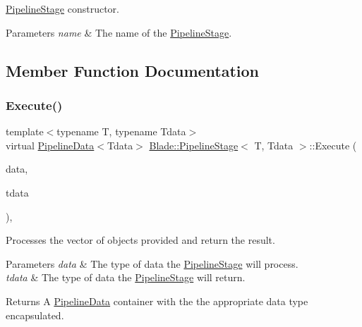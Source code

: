 \hyperlink{class_blade_1_1_pipeline_stage}{Pipeline\+Stage} constructor. 


\begin{DoxyParams}{Parameters}
{\em name} & The name of the \hyperlink{class_blade_1_1_pipeline_stage}{Pipeline\+Stage}. \\
\hline
\end{DoxyParams}


\subsection{Member Function Documentation}
\mbox{\label{class_blade_1_1_pipeline_stage_a0536c99a8bfd4dc16c6b5d7dca43ed58}} 
\subsubsection{\texorpdfstring{Execute()}{Execute()}}
{\footnotesize\ttfamily template$<$typename T, typename Tdata$>$ \\
virtual \hyperlink{class_blade_1_1_pipeline_data}{Pipeline\+Data}$<$Tdata$>$ \hyperlink{class_blade_1_1_pipeline_stage}{Blade\+::\+Pipeline\+Stage}$<$ T, Tdata $>$\+::Execute (\begin{DoxyParamCaption}\item[{const std\+::vector$<$ T $>$ \&}]{data,  }\item[{const \hyperlink{class_blade_1_1_pipeline_data}{Pipeline\+Data}$<$ Tdata $>$ \&}]{tdata }\end{DoxyParamCaption})\hspace{0.3cm}{\ttfamily [pure virtual]}, {\ttfamily [noexcept]}}



Processes the vector of objects provided and return the result. 


\begin{DoxyParams}{Parameters}
{\em data} & The type of data the \hyperlink{class_blade_1_1_pipeline_stage}{Pipeline\+Stage} will process. \\
\hline
{\em tdata} & The type of data the \hyperlink{class_blade_1_1_pipeline_stage}{Pipeline\+Stage} will return. \\
\hline
\end{DoxyParams}
\begin{DoxyReturn}{Returns}
A \hyperlink{class_blade_1_1_pipeline_data}{Pipeline\+Data} container with the the appropriate data type encapsulated. 
\end{DoxyReturn}
\mbox{\label{class_blade_1_1_pipeline_stage_a0b1cca63a255807448e12721c60d91fc}} 

